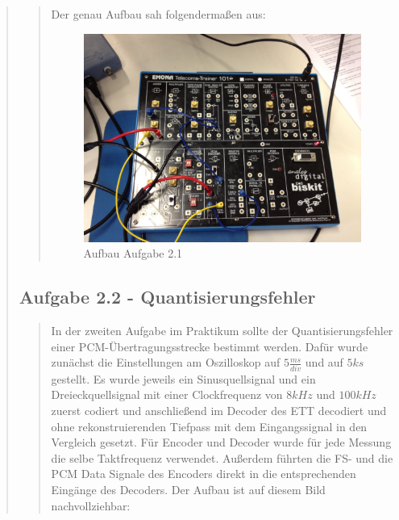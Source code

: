 \begin{quote}
\begin{quote}
         Der genau Aufbau sah folgendermaßen aus:
         \begin{figure}[H]
            \centering
                \includegraphics[scale=0.17, trim = 0cm 0cm 0cm 0cm,
                clip]{./Bilder/Aufgabe_2_1}
                    \caption{Aufbau Aufgabe 2.1}
            \end{figure}
    
         
    \end{quote}  %
    
    \subsection{Aufgabe 2.2 - Quantisierungsfehler}
    \begin{quote}
       
       In der zweiten Aufgabe im Praktikum sollte der Quantisierungsfehler einer
       PCM-Übertragungsstrecke bestimmt werden. Dafür wurde zunächst die
       Einstellungen am Oszilloskop auf $5\frac{ms}{div}$ und auf $5ks$
       gestellt. Es wurde jeweils ein Sinusquellsignal und ein
       Dreieckquellsignal mit einer Clockfrequenz von $8kHz$ und $100kHz$ zuerst
       codiert und anschließend im Decoder des ETT decodiert und ohne
       rekonstruierenden Tiefpass mit dem Eingangssignal in den Vergleich
       gesetzt. Für Encoder und Decoder wurde für jede Messung die selbe
       Taktfrequenz verwendet. Außerdem führten die FS- und die PCM Data Signale
       des Encoders direkt in die entsprechenden Eingänge des Decoders. Der
       Aufbau ist auf diesem Bild nachvollziehbar:
       

\end{quote}
\end{quote}
